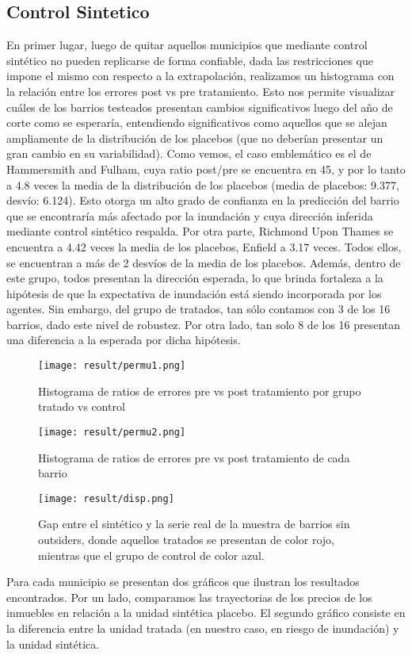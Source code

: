 \documentclass[12pt]{article}
\begin{document}
\subsection{Control Sintetico}

En primer lugar, luego de quitar aquellos municipios que mediante control sintético no pueden replicarse de forma confiable, dada las restricciones que impone el mismo con respecto a la extrapolación, realizamos un histograma con la relación entre los errores post vs pre tratamiento. 
Esto nos permite visualizar cuáles de los barrios testeados presentan cambios significativos luego del año de corte como se esperaría, entendiendo significativos como aquellos que se alejan ampliamente de la distribución de los placebos (que no deberían presentar un gran cambio en su variabilidad). 
Como vemos, el caso emblemático es el de Hammersmith and Fulham, cuya ratio post/pre se encuentra en 45, y por lo tanto a 4.8 veces la media de la distribución de los placebos (media de placebos: 9.377,  desvío: 6.124). Esto otorga un alto grado de confianza en la predicción del barrio que se encontraría más afectado por la inundación y cuya dirección inferida mediante control sintético respalda. 
Por otra parte, Richmond Upon Thames se encuentra a 4.42 veces la media de los placebos, Enfield a 3.17 veces. Todos ellos, se encuentran a más de 2 desvíos de la media de los placebos. Además, dentro de este grupo, todos presentan la dirección esperada, lo que brinda fortaleza a la hipótesis de que la expectativa de inundación está siendo incorporada por los agentes. Sin embargo, del grupo de tratados, tan sólo contamos con 3 de los 16 barrios, dado este nivel de robustez. Por otra lado, tan solo 8 de los 16 presentan una diferencia a la esperada por dicha hipótesis. 

\begin{figure}[H]
\centering
\texttt{[image: result/permu1.png]}
\caption*{Histograma de ratios de errores pre vs post tratamiento por grupo tratado vs control}
\end{figure}
\begin{figure}[H]
\centering
\texttt{[image: result/permu2.png]}
\caption*{Histograma de ratios de errores pre vs post tratamiento de cada barrio}
\end{figure}
\begin{figure}[H]
\centering
\texttt{[image: result/disp.png]}
\caption*{Gap entre el sintético y la serie real de la muestra de barrios  sin outsiders, donde aquellos tratados se presentan de color rojo, mientras que el grupo de control de color azul.}
\end{figure}
Para cada municipio se presentan dos gráficos que ilustran los resultados encontrados. Por un lado, comparamos las trayectorias de los precios de los inmuebles en relación a la unidad sintética placebo. El segundo gráfico consiste en la diferencia entre la unidad tratada (en nuestro caso, en riesgo de inundación) y la unidad sintética.
\end{document}
